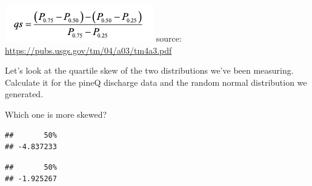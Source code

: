 \documentclass[
]{book}
\newenvironment{Shaded}{\begin{snugshade}}{\end{snugshade}}
\newcommand{\DecValTok}[1]{\textcolor[rgb]{0.00,0.00,0.81}{#1}}
\newcommand{\FunctionTok}[1]{\textcolor[rgb]{0.00,0.00,0.00}{#1}}
\newcommand{\NormalTok}[1]{#1}
\newcommand{\OtherTok}[1]{\textcolor[rgb]{0.56,0.35,0.01}{#1}}
\newcommand{\SpecialCharTok}[1]{\textcolor[rgb]{0.00,0.00,0.00}{#1}}
\begin{document}
\includegraphics{images/Screen Shot 2021-01-25 at 11.27.14 AM.png} source: \url{https://pubs.usgs.gov/tm/04/a03/tm4a3.pdf}

Let's look at the quartile skew of the two distributions we've been measuring. Calculate it for the pineQ discharge data and the random normal distribution we generated.

Which one is more skewed?

\begin{Shaded}
\end{Shaded}

\begin{verbatim}
##       50% 
## -4.837233
\end{verbatim}

\begin{Shaded}
\end{Shaded}

\begin{verbatim}
##       50% 
## -1.925267
\end{verbatim}
\end{document}
